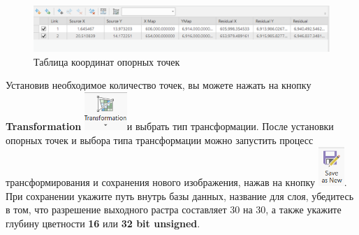 \documentclass[
  12pt,
]{book}
\begin{document}
\begin{figure}
\centering
\includegraphics{images/Ref02/Arc_table.png}
\caption{Таблица координат опорных точек}
\end{figure}

Установив необходимое количество точек, вы можете нажать на кнопку \textbf{Transformation} \includegraphics{images/Ref02/Arc_transformation.png}и выбрать тип трансформации. После установки опорных точек и выбора типа трансформации можно запустить процесс трансформирования и сохранения нового изображения, нажав на кнопку \includegraphics{images/Ref02/Arc_save_as_new.png}. При сохранении укажите путь внутрь базы данных, название для слоя, убедитесь в том, что разрешение выходного растра составляет 30 на 30, а также укажите глубину цветности \textbf{16} или \textbf{32 bit unsigned}.
\end{document}
